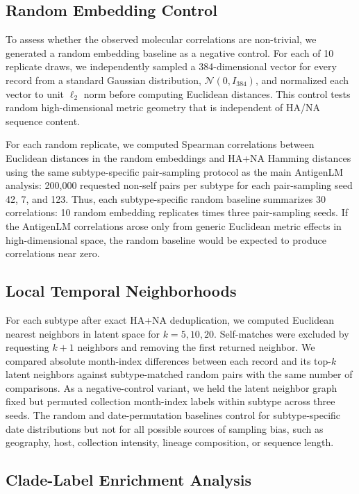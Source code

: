 \documentclass[11pt]{article}
\begin{document}
\subsection{Random Embedding Control}

To assess whether the observed molecular correlations are non-trivial, we generated a random embedding baseline as a negative control. For each of 10 replicate draws, we independently sampled a 384-dimensional vector for every record from a standard Gaussian distribution, $\mathcal{N}(0,I_{384})$, and normalized each vector to unit $\ell_2$ norm before computing Euclidean distances. This control tests random high-dimensional metric geometry that is independent of HA/NA sequence content.

For each random replicate, we computed Spearman correlations between Euclidean distances in the random embeddings and HA+NA Hamming distances using the same subtype-specific pair-sampling protocol as the main AntigenLM analysis: 200,000 requested non-self pairs per subtype for each pair-sampling seed 42, 7, and 123. Thus, each subtype-specific random baseline summarizes 30 correlations: 10 random embedding replicates times three pair-sampling seeds. If the AntigenLM correlations arose only from generic Euclidean metric effects in high-dimensional space, the random baseline would be expected to produce correlations near zero.

\subsection{Local Temporal Neighborhoods}

For each subtype after exact HA+NA deduplication, we computed Euclidean nearest neighbors in latent space for $k=5,10,20$. Self-matches were excluded by requesting $k+1$ neighbors and removing the first returned neighbor. We compared absolute month-index differences between each record and its top-$k$ latent neighbors against subtype-matched random pairs with the same number of comparisons. As a negative-control variant, we held the latent neighbor graph fixed but permuted collection month-index labels within subtype across three seeds. The random and date-permutation baselines control for subtype-specific date distributions but not for all possible sources of sampling bias, such as geography, host, collection intensity, lineage composition, or sequence length.

\subsection{Clade-Label Enrichment Analysis}
\end{document}
